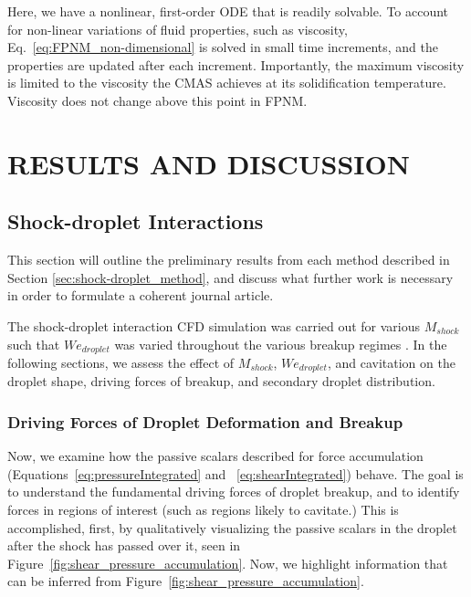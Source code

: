 \documentclass{UCF_ETD}
\begin{document}


\noindent Here, we have a nonlinear, first-order ODE that is readily solvable. To account for non-linear variations of fluid properties, such as viscosity, Eq.~\ref{eq:FPNM_non-dimensional} is solved in small time increments, and the properties are updated after each increment. Importantly, the maximum viscosity is limited to the viscosity the CMAS achieves at its solidification temperature. Viscosity does not change above this point in FPNM.

\chapter{RESULTS AND DISCUSSION}
\section{Shock-droplet Interactions}
\label{sec:shockDropResults}

This section will outline the preliminary results from each method described in Section \ref{sec:shock-droplet_method}, and discuss what further work is necessary in order to formulate a coherent journal article.

The shock-droplet interaction CFD simulation was carried out for various $M_{shock}$ such that $We_{droplet}$ was varied throughout the various breakup regimes \cite{PILCH1987741}. 
In the following sections, we assess the effect of $M_{shock}$, $We_{droplet}$, and cavitation on the droplet shape, driving forces of breakup, and secondary droplet distribution.



\subsection{Driving Forces of Droplet Deformation and Breakup}

Now, we examine how the passive scalars described for force accumulation (Equations~\ref{eq:pressureIntegrated} and ~\ref{eq:shearIntegrated}) behave.
The goal is to understand the fundamental driving forces of droplet breakup, and to identify forces in regions of interest (such as regions likely to cavitate.)
This is accomplished, first, by qualitatively visualizing the passive scalars in the droplet after the shock has passed over it, seen in Figure~\ref{fig:shear_pressure_accumulation}.
Now, we highlight information that can be inferred from Figure~\ref{fig:shear_pressure_accumulation}.\\
\end{document}
